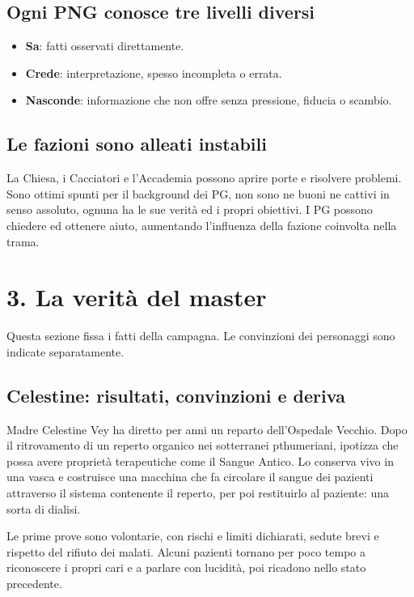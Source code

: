 \documentclass[11pt,a4paper]{article}
\begin{document}
\subsection{Ogni PNG conosce tre livelli diversi}
\begin{itemize}
\item \textbf{Sa}: fatti osservati direttamente.
\item \textbf{Crede}: interpretazione, spesso incompleta o errata.
\item \textbf{Nasconde}: informazione che non offre senza pressione, fiducia o scambio.
\end{itemize}

\subsection{Le fazioni sono alleati instabili}
La Chiesa, i Cacciatori e l'Accademia possono aprire porte e risolvere problemi. Sono ottimi spunti per il background dei PG, non sono ne buoni ne cattivi in senso assoluto, ognuna ha le sue verità ed i propri obiettivi. I PG possono chiedere ed ottenere aiuto, aumentando l'influenza della fazione coinvolta nella trama.
\section{3. La verità del master}

\begin{bloodbox}
Questa sezione fissa i fatti della campagna. Le convinzioni dei personaggi sono indicate separatamente.
\end{bloodbox}

\subsection{Celestine: risultati, convinzioni e deriva}
Madre Celestine Vey ha diretto per anni un reparto dell'Ospedale Vecchio. Dopo il ritrovamento di un reperto organico nei sotterranei pthumeriani, ipotizza che possa avere proprietà terapeutiche come il Sangue Antico. Lo conserva vivo in una vasca e costruisce una macchina che fa circolare il sangue dei pazienti attraverso il sistema contenente il reperto, per poi restituirlo al paziente: una sorta di dialisi.

Le prime prove sono volontarie, con rischi e limiti dichiarati, sedute brevi e rispetto del rifiuto dei malati. Alcuni pazienti tornano per poco tempo a riconoscere i propri cari e a parlare con lucidità, poi ricadono nello stato precedente.
\end{document}
